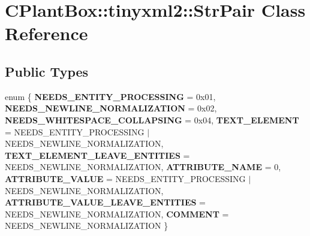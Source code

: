\hypertarget{classCPlantBox_1_1tinyxml2_1_1StrPair}{}\section{C\+Plant\+Box\+:\+:tinyxml2\+:\+:Str\+Pair Class Reference}
\label{classCPlantBox_1_1tinyxml2_1_1StrPair}
\subsection*{Public Types}
\begin{DoxyCompactItemize}
\item 
\mbox{\label{classCPlantBox_1_1tinyxml2_1_1StrPair_afa2240e4fd7d5e974c2dac1a60e29a90}} 
enum \{ \newline
{\bfseries N\+E\+E\+D\+S\+\_\+\+E\+N\+T\+I\+T\+Y\+\_\+\+P\+R\+O\+C\+E\+S\+S\+I\+NG} = 0x01, 
{\bfseries N\+E\+E\+D\+S\+\_\+\+N\+E\+W\+L\+I\+N\+E\+\_\+\+N\+O\+R\+M\+A\+L\+I\+Z\+A\+T\+I\+ON} = 0x02, 
{\bfseries N\+E\+E\+D\+S\+\_\+\+W\+H\+I\+T\+E\+S\+P\+A\+C\+E\+\_\+\+C\+O\+L\+L\+A\+P\+S\+I\+NG} = 0x04, 
{\bfseries T\+E\+X\+T\+\_\+\+E\+L\+E\+M\+E\+NT} = N\+E\+E\+D\+S\+\_\+\+E\+N\+T\+I\+T\+Y\+\_\+\+P\+R\+O\+C\+E\+S\+S\+I\+NG $\vert$ N\+E\+E\+D\+S\+\_\+\+N\+E\+W\+L\+I\+N\+E\+\_\+\+N\+O\+R\+M\+A\+L\+I\+Z\+A\+T\+I\+ON, 
\newline
{\bfseries T\+E\+X\+T\+\_\+\+E\+L\+E\+M\+E\+N\+T\+\_\+\+L\+E\+A\+V\+E\+\_\+\+E\+N\+T\+I\+T\+I\+ES} = N\+E\+E\+D\+S\+\_\+\+N\+E\+W\+L\+I\+N\+E\+\_\+\+N\+O\+R\+M\+A\+L\+I\+Z\+A\+T\+I\+ON, 
{\bfseries A\+T\+T\+R\+I\+B\+U\+T\+E\+\_\+\+N\+A\+ME} = 0, 
{\bfseries A\+T\+T\+R\+I\+B\+U\+T\+E\+\_\+\+V\+A\+L\+UE} = N\+E\+E\+D\+S\+\_\+\+E\+N\+T\+I\+T\+Y\+\_\+\+P\+R\+O\+C\+E\+S\+S\+I\+NG $\vert$ N\+E\+E\+D\+S\+\_\+\+N\+E\+W\+L\+I\+N\+E\+\_\+\+N\+O\+R\+M\+A\+L\+I\+Z\+A\+T\+I\+ON, 
{\bfseries A\+T\+T\+R\+I\+B\+U\+T\+E\+\_\+\+V\+A\+L\+U\+E\+\_\+\+L\+E\+A\+V\+E\+\_\+\+E\+N\+T\+I\+T\+I\+ES} = N\+E\+E\+D\+S\+\_\+\+N\+E\+W\+L\+I\+N\+E\+\_\+\+N\+O\+R\+M\+A\+L\+I\+Z\+A\+T\+I\+ON, 
\newline
{\bfseries C\+O\+M\+M\+E\+NT} = N\+E\+E\+D\+S\+\_\+\+N\+E\+W\+L\+I\+N\+E\+\_\+\+N\+O\+R\+M\+A\+L\+I\+Z\+A\+T\+I\+ON
 \}
\end{DoxyCompactItemize}
